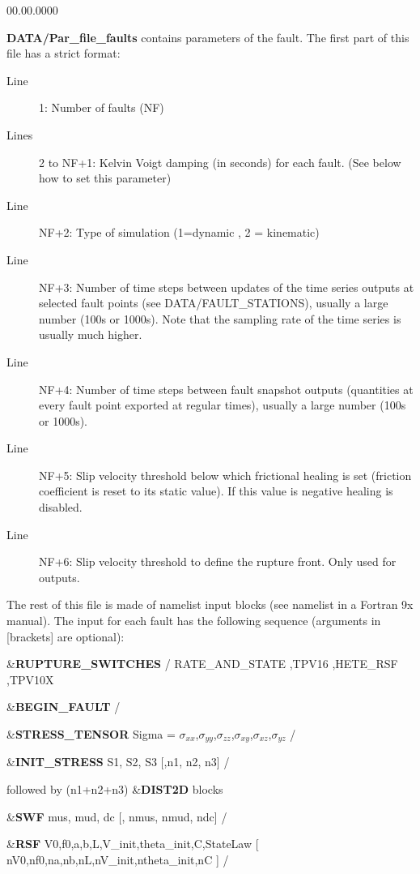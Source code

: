 \begin{lyxlist}{00.00.0000}
\item [{\textbf{DATA/Par\_file\_faults}}] contains parameters of the fault.
The first part of this file has a strict format:

\begin{description}
\item [{Line}] 1: Number of faults (NF)
\item [{Lines}] 2 to NF+1: Kelvin Voigt damping (in seconds) for each fault.
(See below how to set this parameter)
\item [{Line}] NF+2: Type of simulation (1=dynamic , 2 = kinematic)
\item [{Line}] NF+3: Number of time steps between updates of the time series
outputs at selected fault points (see DATA/FAULT\_STATIONS), usually
a large number (100s or 1000s). Note that the sampling rate of the
time series is usually much higher.
\item [{Line}] NF+4: Number of time steps between fault snapshot outputs
(quantities at every fault point exported at regular times), usually
a large number (100s or 1000s).
\item [{Line}] NF+5: Slip velocity threshold below which frictional healing
is set (friction coefficient is reset to its static value). If this
value is negative healing is disabled.
\item [{Line}] NF+6: Slip velocity threshold to define the rupture front.
Only used for outputs.
\end{description}

The rest of this file is made of namelist input blocks (see \textquotedbl{}namelist\textquotedbl{}
in a Fortran 9x manual). The input for each fault has the following
sequence (arguments in {[}brackets{]} are optional):

\&\textbf{RUPTURE\_SWITCHES}  /
RATE\_AND\_STATE ,TPV16 ,HETE\_RSF ,TPV10X

\&\textbf{BEGIN\_FAULT} /

\&\textbf{STRESS\_TENSOR} Sigma = $\sigma_{xx}$,$\sigma_{yy}$,$\sigma_{zz}$,$\sigma_{xy}$,$\sigma_{xz}$,$\sigma_{yz}$ /



\&\textbf{INIT\_STRESS} S1, S2, S3 {[},n1, n2, n3{]} /


followed by (n1+n2+n3) \&\textbf{DIST2D} blocks


\&\textbf{SWF} mus, mud, dc {[}, nmus, nmud, ndc{]} /


\&\textbf{RSF} V0,f0,a,b,L,V\_init,theta\_init,C,StateLaw {[} nV0,nf0,na,nb,nL,nV\_init,ntheta\_init,nC {]} /




\end{lyxlist}
